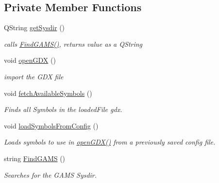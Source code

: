 \subsection*{Private Member Functions}
\begin{DoxyCompactItemize}
\item 
\hypertarget{class_wizard_aca998aca16aff2aad5a3c14f8b954b6b}{}Q\+String \hyperlink{class_wizard_aca998aca16aff2aad5a3c14f8b954b6b}{get\+Sysdir} ()\label{class_wizard_aca998aca16aff2aad5a3c14f8b954b6b}

\begin{DoxyCompactList}\small\item\em calls \hyperlink{class_wizard_a394f3e7a01cd617aa0759533ab2997ae}{Find\+G\+A\+M\+S()}, returns value as a Q\+String \end{DoxyCompactList}\item 
\hypertarget{class_wizard_a1db1a1c24dc5099792e9ad0d183912e1}{}void \hyperlink{class_wizard_a1db1a1c24dc5099792e9ad0d183912e1}{open\+G\+D\+X} ()\label{class_wizard_a1db1a1c24dc5099792e9ad0d183912e1}

\begin{DoxyCompactList}\small\item\em import the G\+D\+X file \end{DoxyCompactList}\item 
\hypertarget{class_wizard_adfe6a1afa0ef03c25371f32119337644}{}void \hyperlink{class_wizard_adfe6a1afa0ef03c25371f32119337644}{fetch\+Available\+Symbols} ()\label{class_wizard_adfe6a1afa0ef03c25371f32119337644}

\begin{DoxyCompactList}\small\item\em Finds all Symbols in the loaded\+File gdx. \end{DoxyCompactList}\item 
\hypertarget{class_wizard_a7873087523305cb8565a33f68d822cf9}{}void \hyperlink{class_wizard_a7873087523305cb8565a33f68d822cf9}{load\+Symbols\+From\+Config} ()\label{class_wizard_a7873087523305cb8565a33f68d822cf9}

\begin{DoxyCompactList}\small\item\em Loads symbols to use in \hyperlink{class_wizard_a1db1a1c24dc5099792e9ad0d183912e1}{open\+G\+D\+X()} from a previously saved config file. \end{DoxyCompactList}\item 
\hypertarget{class_wizard_a394f3e7a01cd617aa0759533ab2997ae}{}string \hyperlink{class_wizard_a394f3e7a01cd617aa0759533ab2997ae}{Find\+G\+A\+M\+S} ()\label{class_wizard_a394f3e7a01cd617aa0759533ab2997ae}

\begin{DoxyCompactList}\small\item\em Searches for the G\+A\+M\+S Sysdir. \end{DoxyCompactList}\end{DoxyCompactItemize}
